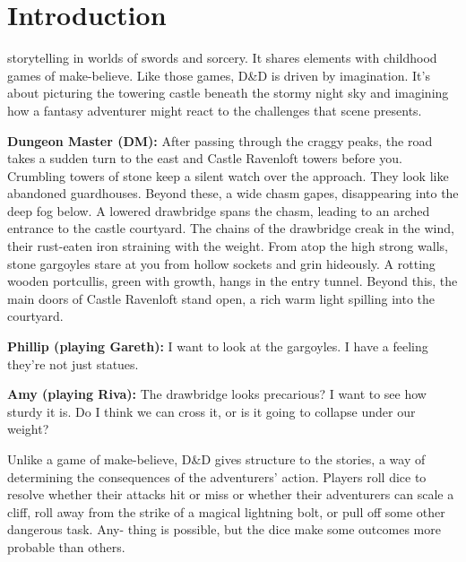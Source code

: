 \chapter*{Introduction}
 storytelling in worlds of swords and sorcery. It shares elements with childhood games of make-believe. Like those games, D\&D is driven by imagination. It’s about picturing the towering castle beneath the stormy night sky and imagining how a fantasy adventurer might react to the challenges that scene presents.

\begin{DndReadAloud}
  \par\textbf{Dungeon Master (DM):} After passing through the craggy peaks, the road takes a sudden turn to the east
and Castle Ravenloft towers before you. Crumbling towers of stone keep a silent watch over the approach. They look like abandoned guardhouses. Beyond these, a wide chasm gapes, disappearing into the deep fog below. A lowered drawbridge spans the chasm, leading to an arched entrance to the castle courtyard. The chains of the drawbridge creak in the wind, their rust-eaten iron straining with the weight. From atop the high strong walls, stone gargoyles stare at you from hollow sockets and grin hideously. A rotting wooden portcullis, green with growth, hangs in the entry tunnel. Beyond this, the main doors of Castle Ravenloft stand open, a rich warm light spilling into the courtyard.
  \par\textbf{Phillip (playing Gareth):} I want to look at the gargoyles. I have a feeling they’re not just statues.
  \par\textbf{Amy (playing Riva):} The drawbridge looks precarious? I want to see how sturdy it is. Do I think we can cross it, or is it going to collapse under our weight?
\end{DndReadAloud}

Unlike a game of make-believe, D\&D gives structure to the stories, a way of determining the consequences of the adventurers’ action. Players roll dice to resolve whether their attacks hit or miss or whether their adventurers can scale a cliff, roll away from the strike of a magical lightning bolt, or pull off some other dangerous task. Any- thing is possible, but the dice make some outcomes more probable than others.

